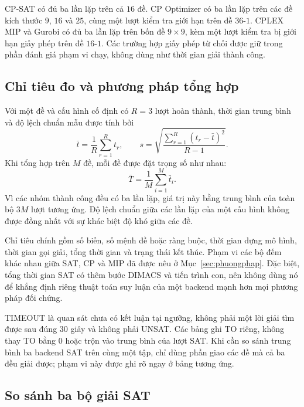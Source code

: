 \documentclass[a4paper,fleqn]{cas-sc}
\begin{document}
CP-SAT có đủ ba lần lặp trên cả $16$ đề. CP Optimizer có ba lần lặp
trên các đề kích thước $9$, $16$ và $25$, cùng một lượt kiểm tra giới
hạn trên đề $36$-$1$. CPLEX MIP và Gurobi có đủ ba lần lặp trên bốn đề
$9\times9$, kèm một lượt kiểm tra bị giới hạn giấy phép trên đề
$16$-$1$. Các trường hợp giấy phép từ chối được giữ trong phần đánh
giá phạm vi chạy, không dùng như thời gian giải thành công.

\subsection{Chỉ tiêu đo và phương pháp tổng hợp}

Với một đề và cấu hình cố định có $R=3$ lượt hoàn thành, thời gian trung
bình và độ lệch chuẩn mẫu được tính bởi
\begin{equation}
 \bar t=\frac{1}{R}\sum_{r=1}^{R}t_r,
 \qquad s=\sqrt{\frac{\sum_{r=1}^{R}(t_r-\bar t)^2}{R-1}}.
 \label{eq:exp-mean-sd}
\end{equation}
Khi tổng hợp trên $M$ đề, mỗi đề được đặt trọng số như nhau:
\begin{equation}
 \bar T=\frac{1}{M}\sum_{i=1}^{M}\bar t_i.
 \label{eq:exp-balanced-mean}
\end{equation}
Vì các nhóm thành công đều có ba lần lặp, giá trị này bằng trung bình
của toàn bộ $3M$ lượt tương ứng. Độ lệch chuẩn giữa các lần lặp của
một cấu hình không được đồng nhất với sự khác biệt độ khó giữa các đề.

Chỉ tiêu chính gồm số biến, số mệnh đề hoặc ràng buộc, thời gian dựng
mô hình, thời gian gọi giải, tổng thời gian và trạng thái kết thúc.
Phạm vi các bộ đếm khác nhau giữa SAT, CP và MIP đã được nêu ở
Mục~\ref{sec:phuongphap}. Đặc biệt, tổng thời gian SAT có thêm bước
DIMACS và tiến trình con, nên không dùng nó để khẳng định riêng thuật
toán suy luận của một backend mạnh hơn mọi phương pháp đối chứng.

TIMEOUT là quan sát chưa có kết luận tại ngưỡng, không phải một lời
giải tìm được sau đúng $30$ giây và không phải UNSAT. Các bảng ghi TO
riêng, không thay TO bằng $0$ hoặc trộn vào trung bình của lượt SAT.
Khi cần so sánh trung bình ba backend SAT trên cùng một tập, chỉ dùng
phần giao các đề mà cả ba đều giải được; phạm vi này được ghi rõ ngay
ở bảng tương ứng.

\subsection{So sánh ba bộ giải SAT}
\end{document}
